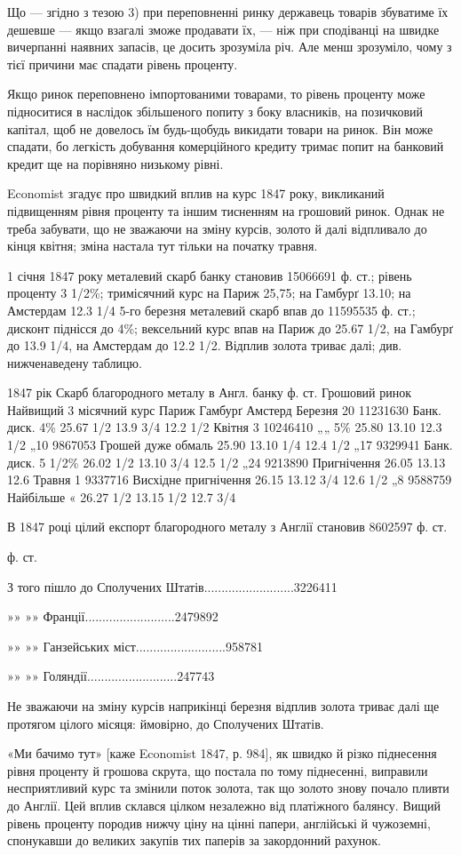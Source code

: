 Що — згідно з тезою 3) при переповненні ринку державець товарів збуватиме
їх дешевше — якщо взагалі зможе продавати їх, — ніж при сподіванці на
швидке вичерпанні наявних запасів, це досить зрозуміла річ. Але менш зрозуміло,
чому з тієї причини має спадати рівень проценту.

Якщо ринок переповнено імпортованими товарами, то рівень проценту може
підноситися в наслідок збільшеного попиту з боку власників, на позичковий
капітал, щоб не довелось їм будь-щобудь викидати товари на ринок. Він може
спадати, бо легкість добування комерційного кредиту тримає попит на банковий
кредит ще на порівняно низькому рівні.

Economist згадує про швидкий вплив на курс 1847 року, викликаний
підвищенням рівня проценту та іншим тисненням на грошовий ринок. Однак не
треба забувати, що не зважаючи на зміну курсів, золото й далі відпливало
до кінця квітня; зміна настала тут тільки на початку травня.

1 січня 1847 року металевий скарб банку становив 15066691 ф. ст.;
рівень проценту 3 1/2\%; тримісячний курс на Париж 25,75; на Гамбурґ 13.10;
на Амстердам 12.3 1/4 5-го березня металевий скарб впав до 11595535 ф. ст.;
дисконт піднісся до 4\%; вексельний курс впав на Париж до 25.67 1/2, на Гамбурґ
до 13.9 1/4, на Амстердам до 12.2 1/2. Відплив золота триває далі; див.
нижченаведену таблицю.

1847 рік
Скарб благородного металу в Англ. банку ф. ст.
Грошовий ринок
Найвищий 3 місячний курс
            Париж    Гамбурґ    Амстерд
Березня 20  11231630   Банк. диск. 4\%   25.67 1/2   13.9 3/4  12.2 1/2
Квітня 3  10246410 „„ 5\%   25.80  13.10     12.3   1/2
„10  9867053  Грошей дуже обмаль 25.90   13.10 1/4   12.4 1/2
„17  9329941  Банк. диск.  5 1/2\%    26.02 1/2    13.10 3/4       12.5 1/2
„24  9213890  Пригнічення       26.05   13.13     12.6
Травня 1 9337716 Висхідне пригнічення 26.15      13.12 3/4    12.6 1/2
„8  9588759  Найбільше « 26.27 1/2      13.15 1/2      12.7 3/4

В 1847 році цілий експорт благородного металу з Англії становив
8602597 ф. ст.

ф. ст.

З того пішло до Сполучених Штатів..........................3226411

»»    »» Франції..........................2479892

 »»    »» Ганзейських міст..........................958781

»»    »» Голяндії..........................247743

Не зважаючи на зміну курсів наприкінці березня відплив золота триває
далі ще протягом цілого місяця: ймовірно, до Сполучених Штатів.

«Ми бачимо тут» [каже Economist 1847, р. 984], як швидко й різко піднесення
рівня проценту й грошова скрута, що постала по тому піднесенні, виправили
несприятливий курс та змінили поток золота, так що золото знову почало
пливти до Англії. Цей вплив склався цілком незалежно від платіжного балянсу.
Вищий рівень проценту породив нижчу ціну на цінні папери, англійські й
чужоземні, спонукавши до великих закупів тих паперів за закордонний рахунок.
